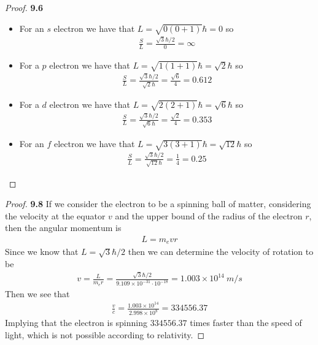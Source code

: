\documentclass[11pt]{article}
\newcommand{\sci}[1]{\times 10^{#1}}
\theoremstyle{definition}
\begin{document}
\cleardoublepage
\begin{proof}{\textbf{9.6}}
\begin{itemize}
\item [\textbf{(a)}] For an $s$ electron we have that
$L = \sqrt{0(0 + 1)}\hbar = 0$ so
\begin{align*}
    \frac{S}{L} = \frac{\sqrt{3}\hbar/2}{0} = \infty
\end{align*}
\item [\textbf{(b)}] For a $p$ electron we have that
$L = \sqrt{1(1 + 1)}\hbar = \sqrt{2}\hbar$ so
\begin{align*}
    \frac{S}{L} = \frac{\sqrt{3}\hbar/2}{\sqrt{2}\hbar}
    = \frac{\sqrt{6}}{4} = 0.612
\end{align*}
\item [\textbf{(c)}] For a $d$ electron we have that
$L = \sqrt{2(2 + 1)}\hbar = \sqrt{6}\hbar$ so
\begin{align*}
    \frac{S}{L} = \frac{\sqrt{3}\hbar/2}{\sqrt{6}\hbar}
    = \frac{\sqrt{2}}{4} = 0.353
\end{align*}
\item [\textbf{(d)}] For an $f$ electron we have that
$L = \sqrt{3(3 + 1)}\hbar = \sqrt{12}\hbar$ so
\begin{align*}
    \frac{S}{L} = \frac{\sqrt{3}\hbar/2}{\sqrt{12}\hbar}
    = \frac{1}{4} = 0.25
\end{align*}
\end{itemize}
\end{proof}

\cleardoublepage
\begin{proof}{\textbf{9.8}}
If we consider the electron to be a spinning ball of matter,
considering the velocity at the equator $v$ and the upper bound of
the radius of the electron $r$, then the angular momentum is
\begin{align*}
    L = m_e vr
\end{align*}
Since we know that $L = \sqrt{3}\hbar/2$ then we can determine the velocity of
rotation to be
\begin{align*}
    v = \frac{L}{m_e r} = \frac{\sqrt{3}\hbar/2}{9.109\sci{-31}\cdot 10^{-18}}
    = 1.003 \sci{14}~m/s
\end{align*}
Then we see that
\begin{align*}
    \frac{v}{c} = \frac{1.003 \sci{14}}{2.998\sci{8}} = 334556.37
\end{align*}
Implying that the electron is spinning $334556.37$ times faster than the speed
of light, which is not possible according to relativity.
\end{proof}
\end{document}
